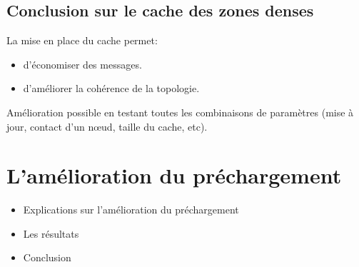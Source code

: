 \documentclass{beamer}
\begin{document}
  \subsection{Conclusion sur le cache des zones denses}
  \begin{frame}
  	La mise en place du cache permet:\\
	\begin{itemize}
		\item d'économiser des messages.\\
		\item d'améliorer la cohérence de la topologie.\\
	\end{itemize}
	\vspace{5mm}
	Amélioration possible en testant toutes les combinaisons de paramètres (mise à jour, contact d'un nœud, taille du cache, etc).\\
  \end{frame}



  \section{L'amélioration du préchargement}
  \begin{frame}
	\vspace{1cm}
	\begin{itemize}
		\item Explications sur l'amélioration du préchargement
		\item Les résultats 
		\item Conclusion 
	\end{itemize}
  \end{frame}
\end{document}
